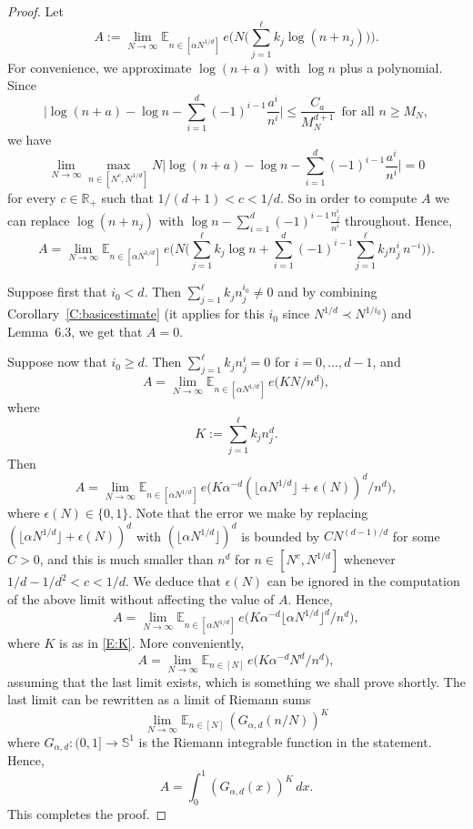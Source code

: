\documentclass[11pt]{amsart}
\theoremstyle{definition}
\newcommand{\E}{{\mathbb E}}
\newcommand{\R}{{\mathbb R}}
\renewcommand{\S}{\mathbb{S}}
\begin{document}
 	\begin{proof}
 		Let
 		$$
 		A:=\lim_{N\to \infty} 	\E_{n\in[\alpha N^{1/d}]}\, e\big(N\big(\sum_{j=1}^\ell k_j \log(n+n_j)\big)\big).
 		$$
 		For convenience, we approximate $\log(n+a)$ with $\log n$ plus a polynomial.  Since
 		$$
 		\Big| \log(n+a)-\log n- \sum_{i=1}^d (-1)^{i-1} \frac{a^i} {n^i}\Big|\leq \frac{C_a}{M_N^{d+1}} \,  \text{ for all } n\geq  M_N,
 		$$
 		we have
 		$$
 		\lim_{N\to\infty} \max_{n\in[N^c,N^{1/d}]} N\Big| \log(n+a)-\log n- \sum_{i=1}^d (-1)^{i-1} \frac{a^i} {n^i}\Big|= 0
 		$$
 		for every $c\in \R_+$ such that $1/(d+1)<c<1/d$.
 		 		So in order to compute $A$ we can replace $\log(n+n_j)$ with
 		$\log n- \sum_{i=1}^d (-1)^{i-1} \frac{n_j^i} {n^i}$ throughout. Hence,
 		$$
 		A=\lim_{N\to \infty} 	\E_{n\in[\alpha N^{1/d}]}\, e\big(N\big(\sum_{j=1}^\ell k_j \log n+\sum_{i=1}^d (-1)^{i-1} \sum_{j=1}^\ell k_jn_j^i \, n^{-i} \big)\big).
 		$$
 		
 		Suppose first that $i_0<d$. Then
 		  $\sum_{j=1}^\ell k_jn_j^{i_0}\neq 0$  and  by combining   Corollary~\ref{C:basicestimate}  (it applies for this $i_0$ since $N^{1/d}\prec N^{1/i_0}$) and Lemma~6.3, we get that $A=0$.
 		
 		Suppose now that   $i_0\geq d$. Then  $\sum_{j=1}^\ell k_jn_j^i= 0$ for $i=0,\ldots, d-1$,  and
 		$$
 		A=\lim_{N\to \infty} 	\E_{n\in[\alpha N^{1/d}]}\, e\big(K N /n^d\big),
 		$$
 		where
 		\begin{equation}\label{E:K}
 		K:=\sum_{j=1}^\ell k_jn_j^d.
 		\end{equation}
 	Then
 		$$
 		A=\lim_{N\to \infty} 	\E_{n\in[\alpha N^{1/d}]}\, e\big(K \alpha^{-d} (\lfloor \alpha N^{1/d}\rfloor +\epsilon(N))^d /n^d \big),
 		$$
 		where $\epsilon(N)\in \{0,1\}$.  Note that  the error we make by replacing
 		$(\lfloor \alpha N^{1/d}\rfloor +\epsilon(N))^d$ with $(\lfloor \alpha N^{1/d}\rfloor)^d$
 		is bounded by  $C N^{(d-1)/d}$ for some $C>0$, and this is much smaller than  $n^d$
 		for $n\in [N^c,N^{1/d}]$ whenever  $1/d-1/d^2<c<1/d$. We  deduce  that $\epsilon(N)$ can be ignored in the computation of the above limit without affecting the value of $A$. Hence,
 			$$
 		A=\lim_{N\to \infty} 	\E_{n\in[\alpha N^{1/d}]}\, e\big(K \alpha^{-d} \lfloor \alpha N^{1/d}\rfloor^d /n^d \big),
 		$$
 		where $K$ is as in \eqref{E:K}. More conveniently,
 			$$
 		A=\lim_{N\to \infty} 	\E_{n\in [N]}\, e\big(K \alpha^{-d} N^d/n^d \big),
 		$$
 		assuming that the last limit exists, which is something we shall prove shortly.
 		The last limit  can be rewritten as  a limit of  Riemann sums
 		$$
 		\lim_{N\to \infty} 	\E_{n\in[N]}\, (G_{\alpha, d}(n/N))^K
 		$$
 		where $G_{\alpha,d}\colon (0,1]\to \S^1$ is the Riemann integrable function in the statement.  Hence,
 		$$
 		A=\int_0^1 (G_{\alpha,d}(x))^K \, dx.
 		$$			
This completes the proof.
 	\end{proof}
 	
\end{document}
